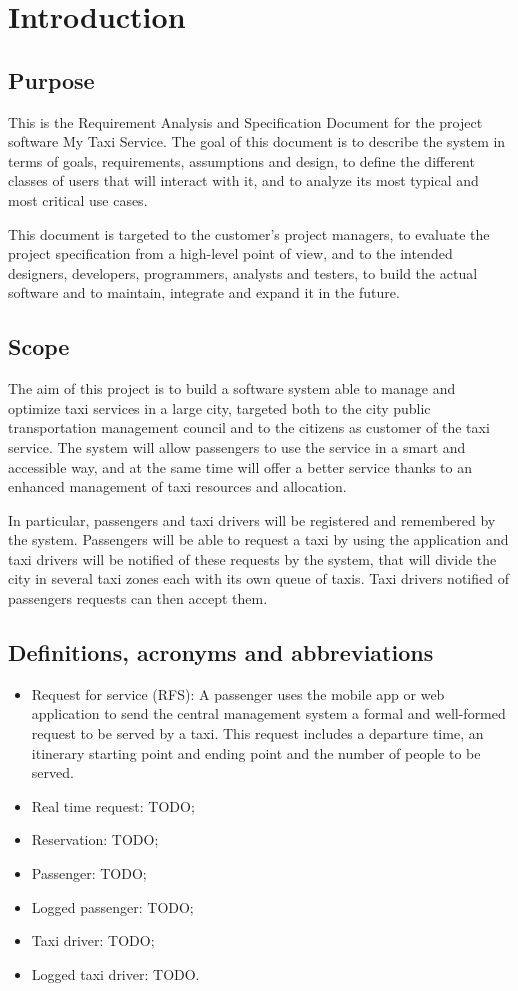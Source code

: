 \chapter{Introduction}

\section{Purpose}
This is the Requirement Analysis and Specification Document for the project software My Taxi Service. The goal of this document is to describe the system in terms of goals, requirements, assumptions and design, to define the different classes of users that will interact with it, and to analyze its most typical and most critical use cases.

This document is targeted to the customer's project managers, to evaluate the project specification from a high-level point of view, and to the intended designers, developers, programmers, analysts and testers, to build the actual software and to maintain, integrate and expand it in the future.

\section{Scope}
The aim of this project is to build a software system able to manage and optimize taxi services in a large city, targeted both to the city public transportation management council and to the citizens as customer of the taxi service. The system will allow passengers to use the service in a smart and accessible way, and at the same time will offer a better service thanks to an enhanced management of taxi resources and allocation.

In particular, passengers and taxi drivers will be registered and remembered by the system. Passengers will be able to request a taxi by using the application and taxi drivers will be notified of these requests by the system, that will divide the city in several taxi zones each with its own queue of taxis. Taxi drivers notified of passengers requests can then accept them.

\section{Definitions, acronyms and abbreviations}
\begin{itemize}

\item Request for service (RFS): A passenger uses the mobile app or web application to send the central management system a formal and well-formed request to be served by a taxi. This request includes a departure time, an itinerary starting point and ending point and the number of people to be served.
\item Real time request: TODO;
\item Reservation: TODO;
\item Passenger: TODO;
\item Logged passenger: TODO;
\item Taxi driver: TODO;
\item Logged taxi driver: TODO.

\end{itemize}


